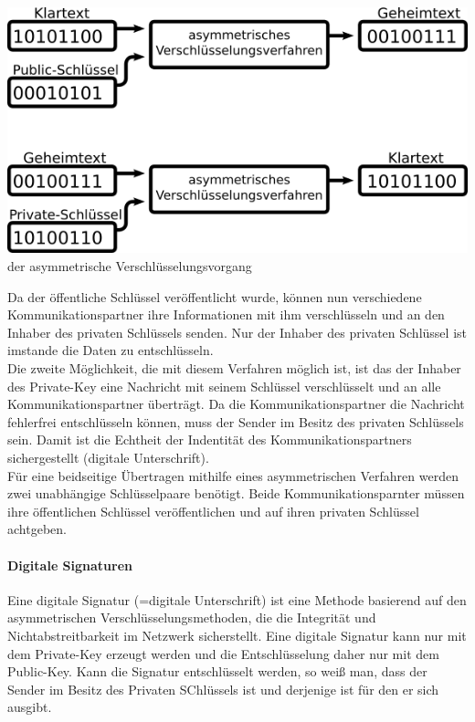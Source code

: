 \documentclass[12pt,a4paper]{report}
\begin{document}
\begin{onehalfspace}
\begin{center}
\includegraphics[scale=3]{img/asym.png}\\
der asymmetrische Verschlüsselungsvorgang
\end{center}

Da der öffentliche Schlüssel veröffentlicht wurde, können nun verschiedene Kommunikationspartner ihre Informationen mit ihm verschlüsseln und an den Inhaber des privaten Schlüssels senden. Nur der Inhaber des privaten Schlüssel ist imstande die Daten zu entschlüsseln.\\
Die zweite Möglichkeit, die mit diesem Verfahren möglich ist, ist das der Inhaber des Private-Key eine Nachricht mit seinem Schlüssel verschlüsselt und an alle Kommunikationspartner überträgt. Da die Kommunikationspartner die Nachricht fehlerfrei entschlüsseln können, muss der Sender im Besitz des privaten Schlüssels sein. Damit ist die Echtheit der Indentität des Kommunikationspartners sichergestellt (digitale Unterschrift).\\
Für eine beidseitige Übertragen mithilfe eines asymmetrischen Verfahren werden zwei unabhängige Schlüsselpaare benötigt. Beide Kommunikationsparnter müssen ihre öffentlichen Schlüssel veröffentlichen und auf ihren privaten Schlüssel achtgeben.

\paragraph{Digitale Signaturen}

Eine digitale Signatur (=digitale Unterschrift) ist eine Methode basierend auf den asymmetrischen Verschlüsselungsmethoden, die die Integrität und Nichtabstreitbarkeit im Netzwerk sicherstellt. Eine digitale Signatur kann nur mit dem Private-Key erzeugt werden und die Entschlüsselung daher nur mit dem Public-Key. Kann die Signatur entschlüsselt werden, so weiß man, dass der Sender im Besitz des Privaten SChlüssels ist und derjenige ist für den er sich ausgibt. \cite{wiki03}


\end{onehalfspace}
\end{document}
